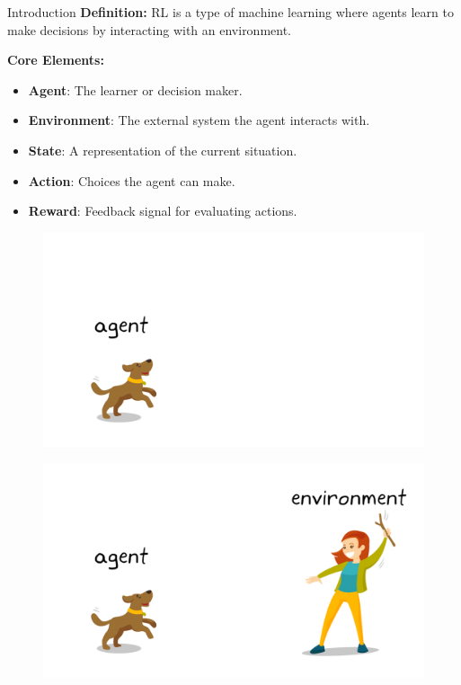 \begin{frame}[allowframebreaks]{Introduction}
    \textbf{Definition:} RL is a type of machine learning where agents learn to make decisions by interacting with an environment.

\framebreak
    {
        \large
        \textbf{Core Elements:}
        \begin{itemize}
            \item<1-> \textbf{Agent}: The learner or decision maker.
            \item \textbf{Environment}: The external system the agent interacts with.
            \item \textbf{State}: A representation of the current situation.
            \item \textbf{Action}: Choices the agent can make.
            \item \textbf{Reward}: Feedback signal for evaluating actions.
        \end{itemize}
    }
\framebreak
    \begin{figure}
        \centering
        \includegraphics[height=0.9\textheight,width=\textwidth,keepaspectratio]{images/intro/agent.png}
    \end{figure}
\framebreak
    \begin{figure}
        \centering
        \includegraphics[height=0.9\textheight,width=\textwidth,keepaspectratio]{images/intro/enviroment.png}

\end{figure}
\end{frame}
